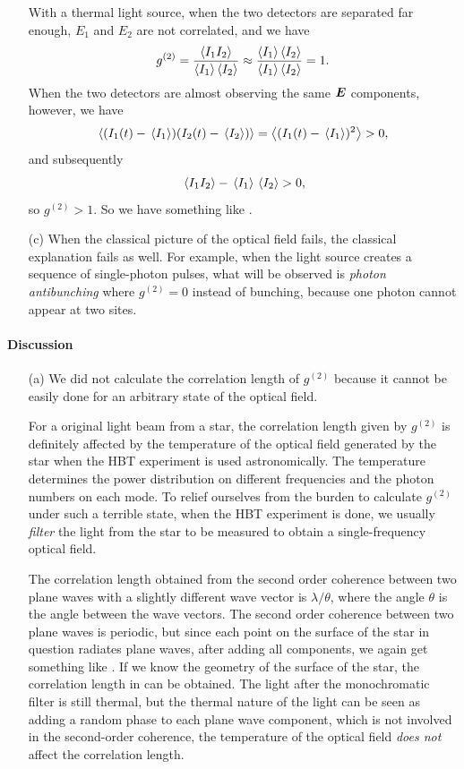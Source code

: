 \documentclass[hyperref, a4paper]{article}
\begin{document}
\begin{itemize}
    With a thermal light source, when the two detectors are separated far enough, $E_1$ and $E_2$ are not correlated, and we have 
    \[
        g^{(2)} = \frac{\expval{I_1 I_2}}{\expval{I_1} \expval{I_2}} \approx \frac{\expval{I_1} \expval{I_2}}{\expval{I_1} \expval{I_2}} = 1.
    \]
    When the two detectors are almost observing the same $\vb*{E}$ components, however, we have 
    \[
        \expval{(I_1(t) - \expval*{I_1}) (I_2(t) - \expval*{I_2})} = \expval{(I_1(t) - \expval*{I_1})^2}> 0,
    \]
    and subsequently
    \[
        \expval*{I_1 I_2} - \expval*{I_1} \expval*{I_2} > 0, 
    \]
    so $g^{(2)} > 1$.
    So we have something like .

    \item[(c)] When the classical picture of the optical field fails, the classical explanation fails as well.
    For example, when the light source creates a sequence of single-photon pulses, what will be observed is \emph{photon antibunching} where $g^{(2)} = 0$ instead of bunching, because one photon cannot appear at two sites.
\end{itemize}

\paragraph{Discussion} \begin{itemize}
    \item[(a)] We did not calculate the correlation length of $g^{(2)}$ because it cannot be easily done for an arbitrary state of the optical field.
    
    For a original light beam from a star, the correlation length given by $g^{(2)}$ is definitely affected by the 
    temperature of the optical field generated by the star when the HBT experiment is used astronomically. 
    The temperature determines the power distribution on different frequencies and the photon numbers on each mode.
    To relief ourselves from the burden to calculate $g^{(2)}$ under such a terrible state, when the HBT experiment is done, 
    we usually \emph{filter} the light from the star to be measured to obtain a single-frequency optical field.

    The correlation length obtained from the second order coherence between two plane waves with a slightly different wave vector 
    is $\lambda / \theta$, where the angle $\theta$ is the angle between the wave vectors. 
    The second order coherence between two plane waves is periodic, but since each point on the surface of the star in question 
    radiates plane waves, after adding all components, we again get something like .
    If we know the geometry of the surface of the star, the correlation length in  can be obtained.
    The light after the monochromatic filter is still thermal, but the thermal nature of the light can be seen as adding a random 
    phase to each plane wave component, which is not involved in the second-order coherence, the temperature of the optical field
    \emph{does not} affect the correlation length.
\end{itemize}
\end{document}
